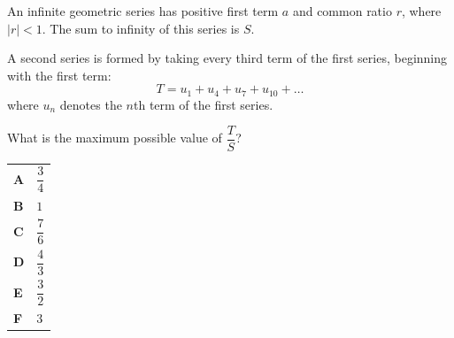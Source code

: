 \documentclass[11pt,a4paper]{article}
\begin{document}
\begin{enumerate}[label=\textbf{\arabic*.},leftmargin=*,itemsep=0pt,start=5]
An infinite geometric series has positive first term $a$ and common ratio $r$, where $|r| < 1$.
The sum to infinity of this series is $S$.

A second series is formed by taking every third term of the first series, beginning with the first term:
\[ T = u_1 + u_4 + u_7 + u_{10} + \dots \]
where $u_n$ denotes the $n$th term of the first series.\vspace*{3pt}

What is the maximum possible value of $\dfrac{T}{S}$?

\par\vspace*{12pt}
\begin{tabularx}{\linewidth}{@{}>{\bfseries}l Y@{}}
A &
$\dfrac{3}{4}$
\\[0.8em]
B &
$1$
\\[0.8em]
C &
$\dfrac{7}{6}$
\\[0.8em]
D &
$\dfrac{4}{3}$
\\[0.8em]
E &
$\dfrac{3}{2}$
\\[0.8em]
F &
$3$
\\
\end{tabularx}
\end{enumerate}
\clearpage
\thispagestyle{djspaper}
\vspace*{8pt}
\end{document}
